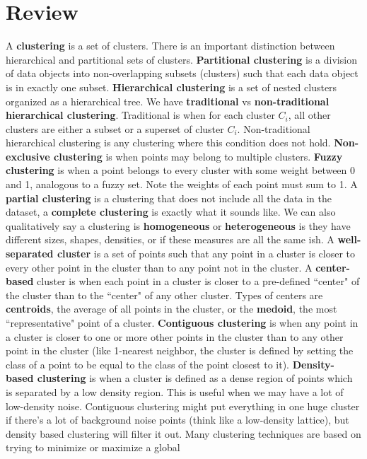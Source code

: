 \documentclass{amsbook}
\theoremstyle{plain}
\theoremstyle{definition}
\theoremstyle{remark}
\begin{document}
\section{Review}

\newpage

\tiny



A \textbf{clustering} is a set of clusters. There is an important distinction between hierarchical and partitional sets of clusters. \textbf{Partitional clustering }is a division of data objects into non-overlapping subsets (clusters) such that each data object is in exactly one subset. \textbf{Hierarchical clustering} is a set of nested clusters organized as a hierarchical tree. We have \textbf{traditional} vs \textbf{non-traditional hierarchical clustering}. Traditional is when for each cluster $C_i$, all other clusters are either a subset or a superset of cluster $C_i$. Non-traditional hierarchical clustering is any clustering where this condition does not hold. \textbf{Non-exclusive clustering} is when points may belong to multiple clusters. \textbf{Fuzzy clustering} is when a point belongs to every cluster with some weight between 0 and 1, analogous to a fuzzy set. Note the weights of each point must sum to 1. A \textbf{partial clustering} is a clustering that does not include all the data in the dataset, a \textbf{complete clustering} is exactly what it sounds like. We can also qualitatively say a clustering is \textbf{homogeneous} or \textbf{heterogeneous} is they have different sizes, shapes, densities, or if these measures are all the same ish. A \textbf{well-separated cluster} is a set of points such that any point in a cluster is closer to every other point in the cluster than to any point not in the cluster. A \textbf{center-based} cluster is when each point in a cluster is closer to a pre-defined ``center" of the cluster than to the ``center" of any other cluster. Types of centers are \textbf{centroids}, the average of all points in the cluster, or the \textbf{medoid}, the most ``representative" point of a cluster. \textbf{Contiguous clustering} is when any point in a cluster is closer to one or more other points in the cluster than to any other point in the cluster (like 1-nearest neighbor, the cluster is defined by setting the class of a point to be equal to the class of the point closest to it). \textbf{Density-based clustering} is when a cluster is defined as a dense region of points which is separated by a low density region. This is useful when we may have a lot of low-density noise. Contiguous clustering might put everything in one huge cluster if there's a lot of background noise points (think like a low-density lattice), but density based clustering will filter it out. Many clustering techniques are based on trying to minimize or maximize a global 
\end{document}
